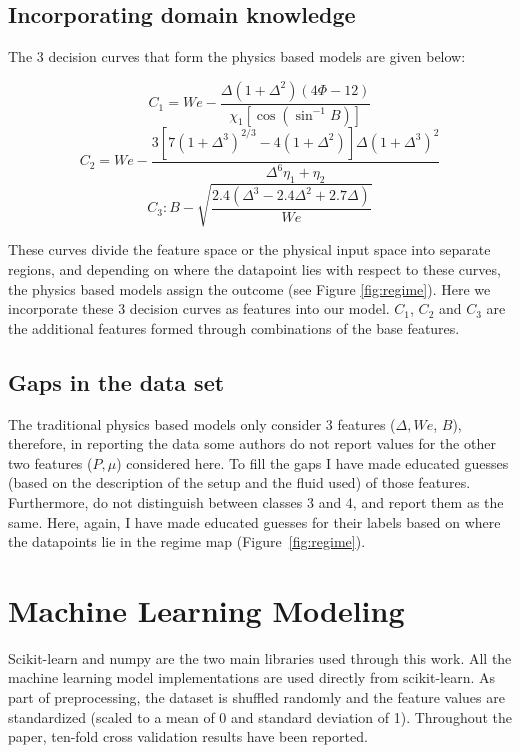 \documentclass{article}
\begin{document}
\subsection{Incorporating domain knowledge}
The 3 decision curves that form the physics based models \cite{munnannur2007new} are given below:

\begin{equation}
\label{eq:c1}
 C_1 = We - \frac{\Delta(1+\Delta^2)(4\Phi - 12)}{\chi_1\left[ \cos\left( \sin^{-1}B\right) \right]}
\end{equation}
\begin{equation}
\label{eq:c2}
 C_2 = We - \frac{3[7(1+\Delta^3)^{2/3} - 4(1+\Delta^2)]\Delta(1+\Delta^3)^2}{\Delta^6 \eta_1 + \eta_2}
\end{equation}
\begin{equation}
\label{eq:c3}
C_3: B - \sqrt{\frac{2.4(\Delta^3- 2.4 \Delta^2 + 2.7\Delta)}{We}}
\end{equation}

These curves divide the feature space or the physical input space into separate regions, and depending on where the datapoint lies with respect to these curves, the physics based models assign the outcome (see Figure \ref{fig:regime}). Here we incorporate these 3 decision curves as features into our model. $C_1$, $C_2$ and $C_3$ are the additional features formed through combinations of the base features. 

\subsection{Gaps in the data set}
The traditional physics based models only consider 3 features ($\Delta, We$, $B$), therefore, in reporting the data some authors do not report values for the other two features ($P, \mu$) considered here. To fill the gaps I have made educated guesses (based on the description of the setup and the fluid used) of those features. Furthermore, \citet{qian1997regimes} do not distinguish between classes 3 and 4, and report them as the same. Here, again, I have made educated guesses for their labels based on where the datapoints lie in the regime map (Figure~\ref{fig:regime}).

\section{Machine Learning Modeling}
Scikit-learn \cite{scikit_learn} and numpy are the two main libraries used through this work. All the machine learning model implementations are used directly from scikit-learn. As part of preprocessing, the dataset is shuffled randomly and the feature values are standardized (scaled  to a mean of 0 and standard deviation of 1). Throughout the paper, ten-fold cross validation results have been reported.
\end{document}
